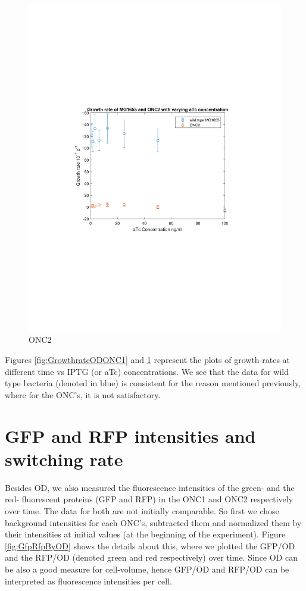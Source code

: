 \documentclass[english,11pt,a4paper]{article}
\begin{document}
\begin{figure}[htbp]
\centering
\includegraphics[scale=0.6]{ONC2growthrate.pdf}
\caption{ONC2}
\label{fig:GrowthrateODONC2}
\end{figure}

Figures \ref{fig:GrowthrateODONC1} and \ref{fig:GrowthrateODONC2} represent the plots of growth-rates at different time vs IPTG (or aTc) concentrations. We see that the data for wild type bacteria (denoted in blue) is consistent for the reason mentioned previously, where for the ONC's, it is not satisfactory. 

\section{GFP and RFP intensities and switching rate}
Besides OD, we also measured the fluorescence intensities of the green- and the red- fluorescent proteins (GFP and RFP) in the ONC1 and ONC2 respectively over time. The data for both are not initially comparable. So first we chose background intensities for each ONC's, subtracted them and normalized them by their intensities at initial values (at the beginning of the experiment). Figure \ref{fig:GfpRfpByOD} shows the details about this, where we plotted the GFP/OD and the RFP/OD (denoted green and red respectively) over time. Since OD can be also a good measure for cell-volume, hence GFP/OD and RFP/OD can be interpreted as fluorescence intensities per cell. 
\end{document}
